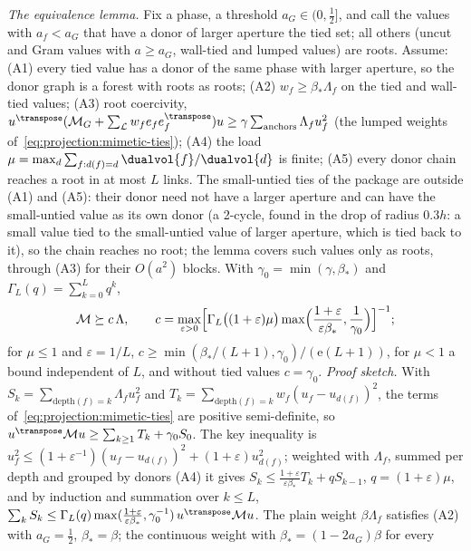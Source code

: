 \emph{The equivalence lemma.} Fix a phase, a threshold $a_G\in(0,\tfrac12]$,
and call the values with $a_f<a_G$ that have a donor of larger aperture the
tied set; all others (uncut and Gram values with $a\ge a_G$, wall-tied and
lumped values) are roots. Assume: (A1) every tied value has a donor of
the same phase with larger aperture, so the donor graph is a forest with roots
as roots; (A2) $w_f\ge\beta_*\Lambda_f$ on the tied and wall-tied values;
(A3) root coercivity,
$u^{\transpose}(\mathcal M_G+\sum_{\mathcal L}w_fe_fe_f^{\transpose})u\ge\gamma\sum_{\text{anchors}}\Lambda_fu_f^2$
(the lumped weights of~\cref{eq:projection:mimetic-ties});
(A4) the load $\mu=\max_d\sum_{f:d(f)=d}\dualvol{f}/\dualvol{d}$ is finite; (A5)
every donor chain reaches a root in at most $L$ links. The small-untied ties
of the package are outside (A1) and (A5): their donor need not have a larger
aperture and can have the small-untied value as its own donor (a 2-cycle,
found in the drop of radius $0.3h$: a small value tied to the small-untied
value of larger aperture, which is tied back to it), so the chain reaches no
root; the lemma covers such values only as roots, through (A3) for their
$O(a^2)$ blocks. With
$\gamma_0=\min(\gamma,\beta_*)$ and $\Gamma_L(q)=\sum_{k=0}^Lq^k$,
\begin{equation}\label{eq:projection:mimetic-equivalence}
  \mathcal M\succeq c\,\Lambda,\qquad
  c=\max_{\varepsilon>0}\Bigl[\Gamma_L\bigl((1+\varepsilon)\mu\bigr)
  \max\Bigl(\frac{1+\varepsilon}{\varepsilon\beta_*},\frac1{\gamma_0}\Bigr)\Bigr]^{-1};
\end{equation}
for $\mu\le1$ and $\varepsilon=1/L$, $c\ge\min(\beta_*/(L+1),\gamma_0)/(\mathrm e(L+1))$,
for $\mu<1$ a bound independent of $L$, and without tied values $c=\gamma_0$.
\emph{Proof sketch.} With $S_k=\sum_{\mathrm{depth}(f)=k}\Lambda_fu_f^2$ and
$T_k=\sum_{\mathrm{depth}(f)=k}w_f(u_f-u_{d(f)})^2$, the terms
of~\cref{eq:projection:mimetic-ties} are positive semi-definite, so
$u^{\transpose}\mathcal Mu\ge\sum_{k\ge1}T_k+\gamma_0S_0$. The key inequality is
$u_f^2\le(1+\varepsilon^{-1})(u_f-u_{d(f)})^2+(1+\varepsilon)u_{d(f)}^2$; weighted
with $\Lambda_f$, summed per depth and grouped by donors (A4) it gives
$S_k\le\frac{1+\varepsilon}{\varepsilon\beta_*}T_k+qS_{k-1}$, $q=(1+\varepsilon)\mu$,
and by induction and summation over $k\le L$,
$\sum_kS_k\le\Gamma_L(q)\max(\frac{1+\varepsilon}{\varepsilon\beta_*},\gamma_0^{-1})\,u^{\transpose}\mathcal Mu$.
The plain weight $\beta\Lambda_f$ satisfies (A2) with $a_G=\tfrac12$,
$\beta_*=\beta$; the continuous weight with $\beta_*=(1-2a_G)\beta$ for every
